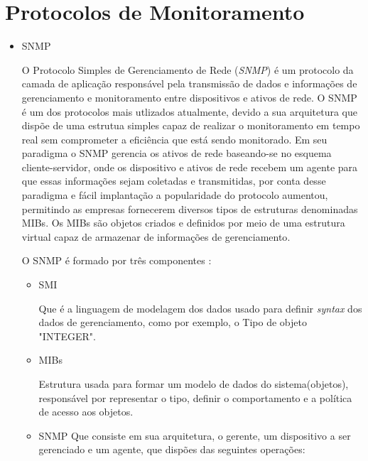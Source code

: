 
\section{Protocolos de Monitoramento}
\begin{itemize}
\item SNMP

O Protocolo Simples de Gerenciamento de Rede (\textit{\acrlong{SNMP}}) é um protocolo da camada de aplicação responsável pela transmissão de dados e informações de gerenciamento e monitoramento entre dispositivos e ativos de rede. O \acrshort{SNMP} é um dos protocolos mais utlizados atualmente, devido a sua arquitetura que dispõe de uma estrutua simples capaz de realizar o monitoramento em tempo real sem comprometer a eficiência que está sendo monitorado\cite{roohi2014application}. Em seu paradigma o \acrshort{SNMP} gerencia os ativos de rede baseando-se no esquema cliente-servidor, onde os dispositivo e ativos de rede recebem um agente para que essas informações sejam coletadas e transmitidas, por conta desse paradigma e fácil implantação a popularidade do protocolo aumentou, permitindo as empresas fornecerem diversos tipos de estruturas denominadas \acrshort{MIBs}. Os \acrshort{MIBs} são objetos criados e definidos por meio de uma estrutura virtual capaz de armazenar de informações de gerenciamento\cite{roohi2014application,presuhn2002management}.

O \acrshort{SNMP} é formado por três componentes \cite{nadeau2003mpls}:  

    \begin{itemize}
    \item \acrshort{SMI}
    
    Que é a linguagem de modelagem dos dados usado para definir \textit{syntax} dos dados de gerenciamento, como por exemplo, o Tipo de objeto "INTEGER".
    
    \item \acrshort{MIBs}
    
    Estrutura usada para formar um modelo de dados do sistema(objetos), responsável por representar o tipo, definir o comportamento e a política de acesso aos objetos.
    
    \item \acrshort{SNMP}
    Que consiste em sua arquitetura, o gerente, um dispositivo a ser gerenciado e um agente, que dispões das seguintes operações:
    

\end{itemize}
\end{itemize}
